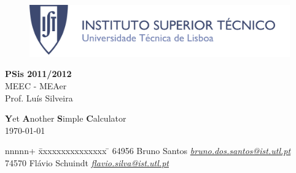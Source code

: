 \pagestyle{empty}		%


\begin{figure}[h!]
	\centering
	\includegraphics[width=\textwidth]{Img/others/ISTheader}
\end{figure}

\vspace{10mm}
\begin{flushleft}
	\huge{\textbf{PSis 2011/2012}}\\
	\LARGE{MEEC - MEAer}\\
	\Large{Prof. Luís Silveira}
\end{flushleft}

\vspace{20mm}
\begin{center}
	\Huge{\textbf{Y}et \textbf{A}nother \textbf{S}imple \textbf{C}alculator}\\
	\vspace{5mm}
	\large{\today}
\end{center}


\vspace{80mm}
\large{
	\begin{tabbing}			%
		\hspace{50mm}nnnnn+ \= xxxxxxxxxxxxxxx \= \kill
		\hspace{50mm}64956 \> Bruno Santos \> \href{mailto:bruno.dos.santos@ist.utl.pt}{\emph{bruno.dos.santos@ist.utl.pt}} \\
		\hspace{50mm}74570 \> Flávio Schuindt \> \href{mailto:flavio.silva@ist.utl.pt}{\emph{flavio.silva@ist.utl.pt}}
	\end{tabbing}
}

\blankpage
